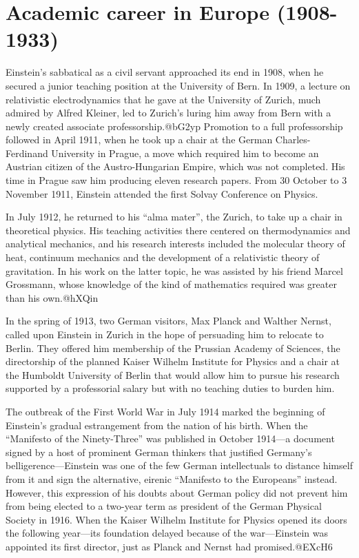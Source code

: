 \documentclass[twoside]{memoir}
\begin{document}
\chapter{Academic career in Europe (1908-1933)}
Einstein's sabbatical as a civil servant approached its end in 1908, when he secured a junior teaching position at the University of Bern. In 1909, a lecture on relativistic electrodynamics that he gave at the University of Zurich, much admired by Alfred Kleiner, led to Zurich's luring him away from Bern with a newly created associate professorship.@bG2yp Promotion to a full professorship followed in April 1911, when he took up a chair at the German Charles-Ferdinand University in Prague, a move which required him to become an Austrian citizen of the Austro-Hungarian Empire, which was not completed. His time in Prague saw him producing eleven research papers. From 30 October to 3 November 1911, Einstein attended the first Solvay Conference on Physics.

In July 1912, he returned to his \enquote{alma mater}, the  Zurich, to take up a chair in theoretical physics. His teaching activities there centered on thermodynamics and analytical mechanics, and his research interests included the molecular theory of heat, continuum mechanics and the development of a relativistic theory of gravitation. In his work on the latter topic, he was assisted by his friend Marcel Grossmann, whose knowledge of the kind of mathematics required was greater than his own.@hXQin

In the spring of 1913, two German visitors, Max Planck and Walther Nernst, called upon Einstein in Zurich in the hope of persuading him to relocate to Berlin. They offered him membership of the Prussian Academy of Sciences, the directorship of the planned Kaiser Wilhelm Institute for Physics and a chair at the Humboldt University of Berlin that would allow him to pursue his research supported by a professorial salary but with no teaching duties to burden him.

The outbreak of the First World War in July 1914 marked the beginning of Einstein's gradual estrangement from the nation of his birth. When the \enquote{Manifesto of the Ninety-Three} was published in October 1914---a document signed by a host of prominent German thinkers that justified Germany's belligerence---Einstein was one of the few German intellectuals to distance himself from it and sign the alternative, eirenic \enquote{Manifesto to the Europeans} instead. However, this expression of his doubts about German policy did not prevent him from being elected to a two-year term as president of the German Physical Society in 1916. When the Kaiser Wilhelm Institute for Physics opened its doors the following year---its foundation delayed because of the war---Einstein was appointed its first director, just as Planck and Nernst had promised.@EXcH6
\end{document}
